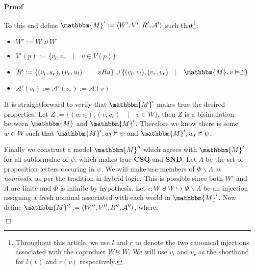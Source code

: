 \documentclass{article}
\newcommand{\assign}{:=}
\newcommand{\tmem}[1]{{\em #1\/}}
\newcommand{\tmtextbf}[1]{{\bfseries{#1}}}
\newenvironment{itemizedot}{\begin{itemize} \renewcommand{\labelitemi}{$\bullet$}\renewcommand{\labelitemii}{$\bullet$}\renewcommand{\labelitemiii}{$\bullet$}\renewcommand{\labelitemiv}{$\bullet$}}{\end{itemize}}
\newenvironment{proof}{\noindent\textbf{Proof\ }}{\hspace*{\fill}$\Box$\medskip}
\begin{document}
\begin{proof}
  
  
  To this end define $\mathbbm{M}' \assign \langle W', V', R', \mathcal{A}'
  \rangle$ such that{\footnote{Throughout this article, we use $l$ and $r$ to
  denote the two canonical injections associated with the coproduct $W \uplus
  W$. We will use $v_l$ and $v_r$ as the shorthand for $l (v)$ and $r (v)$
  respectively.}}: {\hspace*{\fill}}
  \begin{itemizedot}
    \item $W' \assign W \uplus W$
    
    \item $V' (p) \assign \{v_l, v_r \hspace{1em} | \hspace{1em} v \in V
    (p)\}$
    
    \item $R' \assign \{(v_l, u_r), (v_r, u_l) \hspace{1em} | \hspace{1em} v R
    u\} \cup \{(v_l, v_l), (v_r, v_r) \hspace{1em} | \hspace{1em} \mathbbm{M},
    v \vDash \circlearrowleft\}$
    
    \item $\mathcal{A}' (v_l) \assign \mathcal{A}' (v_r) \assign \mathcal{A}
    (v)$
  \end{itemizedot}
  
  
  It is straightforward to verify that $\mathbbm{M}'$ makes true the desired
  properties.  Let $Z \assign \{(v, v_l), (v, v_r) \hspace{1em} |
  \hspace{1em} v \in W\}$.  then $Z$ is a bisimulation between $\mathbbm{M}$
  and $\mathbbm{M}'$.  Therefore we know there is some $w \in W$ such that
  $\mathbbm{M}', w_l \nvDash \psi$ and $\mathbbm{M}', w_r \nvDash \psi$.
  
  
  
  Finally we construct a model $\mathbbm{M}''$ which agrees with
  $\mathbbm{M}'$ for all subformulae of $\psi$, which makes true
  \tmtextbf{CSQ} and \tmtextbf{SND}.  Let $\Lambda$ be the set of proposition
  letters occuring in $\psi$.  We will make use members of $\Phi \backslash
  \Lambda$ as {\tmem{nominals}}, as per the tradition in hybrid logic.  This
  is possible since both $W'$ and $\Lambda$ are finite and $\Phi$ is infinite
  by hypothesis.  Let $\iota : W \uplus W \hookrightarrow \Phi \backslash
  \Lambda$ be an injection assigning a fresh nominal associated with each
  world in $\mathbbm{M}'$.  Now define $\mathbbm{M}'' \assign \langle W'',
  V'', R'', \mathcal{A}'' \rangle$, where:
  

\end{proof}
\end{document}
